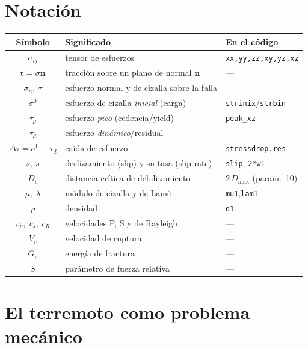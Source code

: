 \documentclass[11pt,a4paper]{article}
\newcommand{\vv}[1]{\mathbf{#1}}
\newcommand{\Dc}{D_c}
\newcommand{\taup}{\tau_p}
\newcommand{\taud}{\tau_d}
\begin{document}
\section*{Notación}
\begin{center}
\begin{tabular}{c l l}
\toprule
Símbolo & Significado & En el código \\
\midrule
$\sigma_{ij}$        & tensor de esfuerzos & \texttt{xx,yy,zz,xy,yz,xz} \\
$\vv{t}=\sigma\vv{n}$ & tracción sobre un plano de normal $\vv{n}$ & --- \\
$\sigma_n,\ \tau$    & esfuerzo normal y de cizalla sobre la falla & --- \\
$\sigma^0$           & esfuerzo de cizalla \emph{inicial} (carga) & \texttt{strinix}/\texttt{strbin} \\
$\taup$              & esfuerzo \emph{pico} (cedencia/yield) & \texttt{peak\_xz} \\
$\taud$              & esfuerzo \emph{dinámico}/residual & --- \\
$\Delta\tau=\sigma^0-\taud$ & caída de esfuerzo & \texttt{stressdrop.res} \\
$s,\ \dot s$         & deslizamiento (slip) y su tasa (slip-rate) & \texttt{slip}, \texttt{2*w1} \\
$\Dc$                & distancia crítica de debilitamiento & $2\,D_{\max}$ (param.\ 10) \\
$\mu,\ \lambda$      & módulo de cizalla y de Lamé & \texttt{mu1},\texttt{lam1} \\
$\rho$               & densidad & \texttt{d1} \\
$v_p,\ v_s,\ c_R$    & velocidades P, S y de Rayleigh & --- \\
$V_r$                & velocidad de ruptura & --- \\
$G_c$                & energía de fractura & --- \\
$S$                  & parámetro de fuerza relativa & --- \\
\bottomrule
\end{tabular}
\end{center}

\newpage
\section{El terremoto como problema mecánico}
\end{document}
